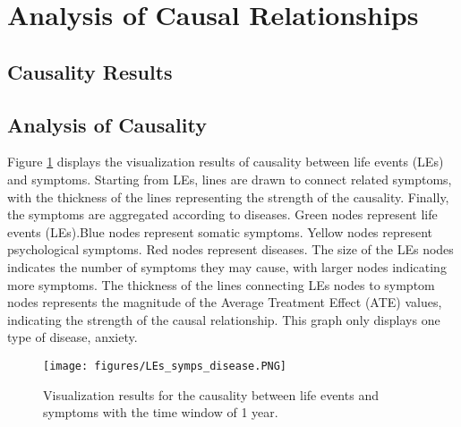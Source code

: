\section{Analysis of Causal Relationships}
\label{sec:case study}


\subsection{Causality Results}



\subsection{Analysis of Causality}
Figure \ref{fig:LEs_symps_disease} displays the visualization results of causality between life events (LEs) and symptoms. Starting from LEs, lines are drawn to connect related symptoms, with the thickness of the lines representing the strength of the causality. Finally, the symptoms are aggregated according to diseases.
Green nodes represent life events (LEs).Blue nodes represent somatic symptoms. Yellow nodes represent psychological symptoms. Red nodes represent diseases. The size of the LEs nodes indicates the number of symptoms they may cause, with larger nodes indicating more symptoms. The thickness of the lines connecting LEs nodes to symptom nodes represents the magnitude of the Average Treatment Effect (ATE) values, indicating the strength of the causal relationship. This graph only displays one type of disease, anxiety.



\begin{figure}[th]
	\centering
	\texttt{[image: figures/LEs\_symps\_disease.PNG]}
	\caption{Visualization results for the causality between life events and symptoms with the time window of 1 year. }
	\label{fig:LEs_symps_disease}
\end{figure}
